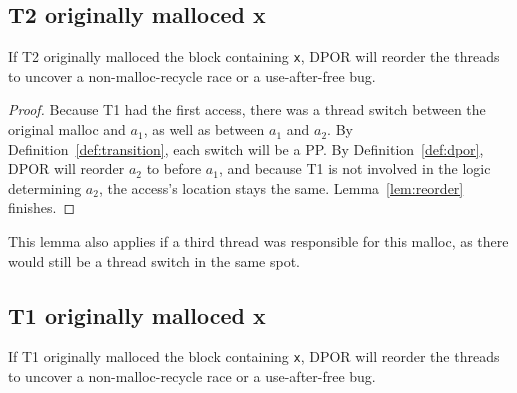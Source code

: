 \subsection{T2 originally malloced x}

\begin{lemma}[Greedo]
	If T2 originally malloced the block containing {\tt x}, DPOR will reorder the threads to uncover a non-malloc-recycle race or a use-after-free bug.
	\label{lem:greedo}
\end{lemma}
\begin{proof}
Because T1 had the first access, there was a thread switch between the original malloc and $a_1$, as well as between $a_1$ and $a_2$. By Definition~\ref{def:transition}, each switch will be a PP.
By Definition~\ref{def:dpor}, DPOR will reorder $a_2$ to before $a_1$,
and because T1 is not involved in the logic determining $a_2$, the access's location stays the same.
Lemma~\ref{lem:reorder} finishes.
\end{proof}

This lemma also applies if a third thread was responsible for this malloc, as there would still be a thread switch in the same spot.

\subsection{T1 originally malloced x}

\begin{lemma}[Han]
	If T1 originally malloced the block containing {\tt x}, DPOR will reorder the threads to uncover a non-malloc-recycle race or a use-after-free bug.
	\label{lem:han}
\end{lemma}

